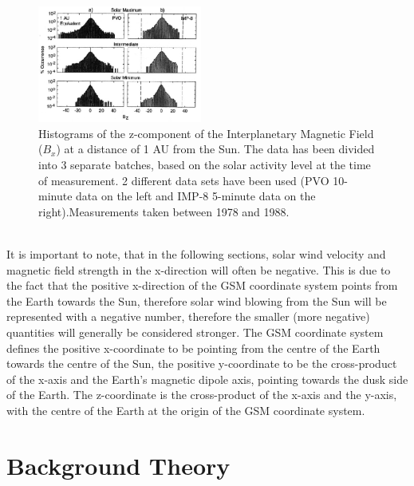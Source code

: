 \documentclass[12pt]{article}
\begin{document}
        \begin{figure}[t!]
            \centering
            \includegraphics[width=0.48\textwidth]{fig_introduction/russellBZ.png}
            \caption{Histograms of the z-component of the Interplanetary Magnetic Field ($B_x$) at a distance of 1 AU from the Sun\cite{2001russell}. The data has been divided into 3 separate batches, based on the solar activity level at the time of measurement. 2 different data sets have been used (PVO 10-minute data on the left and IMP-8 5-minute data on the right).Measurements taken between 1978 and 1988.}
            \label{fig:russellBZ}
        \end{figure}\\
        It is important to note, that in the following sections, solar wind velocity and magnetic field strength in the x-direction will often be negative. This is due to the fact that the positive x-direction of the GSM coordinate system points from the Earth towards the Sun, therefore solar wind blowing from the Sun will be represented with a negative number, therefore the smaller (more negative) quantities will generally be considered stronger. The GSM coordinate system defines\cite{2017laundal} the positive x-coordinate to be pointing from the centre of the Earth towards the centre of the Sun, the positive y-coordinate to be the cross-product of the x-axis and the Earth's magnetic dipole axis, pointing towards the dusk side of the Earth. The z-coordinate is the cross-product of the x-axis and the y-axis, with the centre of the Earth at the origin of the GSM coordinate system.
\section{Background Theory}\label{sec:theory}
\end{document}
